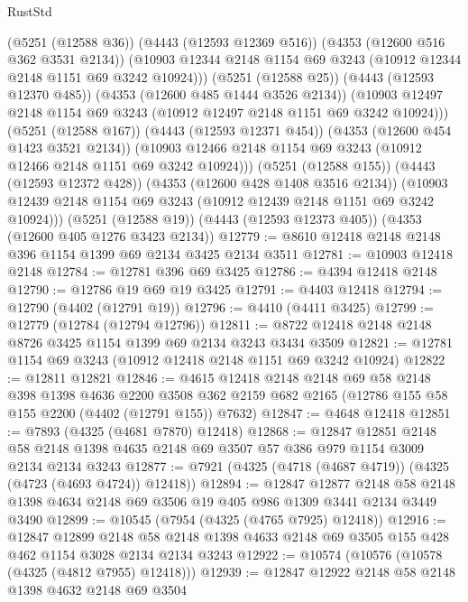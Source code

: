 \begin{lexlean}{RustStd}
\begin{coremodule}
            (@5251 (@12588 @36))
            (@4443 (@12593 @12369 @516))
            (@4353 (@12600 @516 @362 @3531 @2134))
            (@10903 @12344 @2148 @1154 @69 @3243 (@10912 @12344 @2148 @1151 @69 @3242 @10924)))
          (@5251 (@12588 @25))
          (@4443 (@12593 @12370 @485))
          (@4353 (@12600 @485 @1444 @3526 @2134))
          (@10903 @12497 @2148 @1154 @69 @3243 (@10912 @12497 @2148 @1151 @69 @3242 @10924)))
        (@5251 (@12588 @167))
        (@4443 (@12593 @12371 @454))
        (@4353 (@12600 @454 @1423 @3521 @2134))
        (@10903 @12466 @2148 @1154 @69 @3243 (@10912 @12466 @2148 @1151 @69 @3242 @10924)))
      (@5251 (@12588 @155))
      (@4443 (@12593 @12372 @428))
      (@4353 (@12600 @428 @1408 @3516 @2134))
      (@10903 @12439 @2148 @1154 @69 @3243 (@10912 @12439 @2148 @1151 @69 @3242 @10924)))
    (@5251 (@12588 @19))
    (@4443 (@12593 @12373 @405))
    (@4353 (@12600 @405 @1276 @3423 @2134))
@12779 := @8610 @12418 @2148 @2148 @396 @1154 @1399 @69 @2134 @3425 @2134 @3511
@12781 := @10903 @12418 @2148
@12784 := @12781 @396 @69 @3425
@12786 := @4394 @12418 @2148
@12790 := @12786 @19 @69 @19 @3425
@12791 := @4403 @12418
@12794 := @12790 (@4402 (@12791 @19))
@12796 := @4410 (@4411 @3425)
@12799 := @12779 (@12784 (@12794 @12796))
@12811 := @8722 @12418 @2148 @2148 @8726 @3425 @1154 @1399 @69 @2134 @3243 @3434 @3509
@12821 := @12781 @1154 @69 @3243 (@10912 @12418 @2148 @1151 @69 @3242 @10924)
@12822 := @12811 @12821
@12846 := @4615
    @12418
    @2148
    @2148
    @69
    @58
    @2148
    @398
    @1398
    @4636
    @2200
    @3508
    @362
    @2159
    @682
    @2165
    (@12786 @155 @58 @155 @2200 (@4402 (@12791 @155)) @7632)
@12847 := @4648 @12418
@12851 := @7893 (@4325 (@4681 @7870) @12418)
@12868 := @12847
    @12851
    @2148
    @58
    @2148
    @1398
    @4635
    @2148
    @69
    @3507
    @57
    @386
    @979
    @1154
    @3009
    @2134
    @2134
    @3243
@12877 := @7921 (@4325 (@4718 (@4687 @4719)) (@4325 (@4723 (@4693 @4724)) @12418))
@12894 := @12847
    @12877
    @2148
    @58
    @2148
    @1398
    @4634
    @2148
    @69
    @3506
    @19
    @405
    @986
    @1309
    @3441
    @2134
    @3449
    @3490
@12899 := @10545 (@7954 (@4325 (@4765 @7925) @12418))
@12916 := @12847
    @12899
    @2148
    @58
    @2148
    @1398
    @4633
    @2148
    @69
    @3505
    @155
    @428
    @462
    @1154
    @3028
    @2134
    @2134
    @3243
@12922 := @10574 (@10576 (@10578 (@4325 (@4812 @7955) @12418)))
@12939 := @12847
    @12922
    @2148
    @58
    @2148
    @1398
    @4632
    @2148
    @69
    @3504

\end{coremodule}
\end{lexlean}
